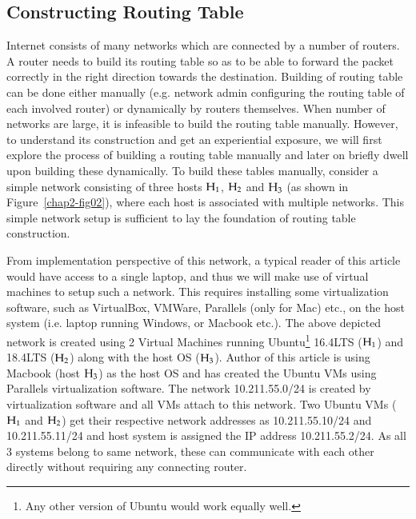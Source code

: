 \begin{multicols}{2}
\section{Constructing Routing Table}\label{chap2-sec4}

Internet consists of many networks which are connected by a number of routers. A router needs to build its routing table so as to be able to forward the packet correctly in the right direction towards the destination. Building of routing table can be done either manually (e.g. network admin configuring the routing table of each involved router) or dynamically by routers themselves. When number of networks are large, it is infeasible to build the routing table manually. However, to understand its construction and get an experiential exposure, we will first explore the process of building a routing table manually and later on briefly dwell upon building these dynamically. To build these tables manually, consider a simple network consisting of three hosts ${\rm H}_{1}$, ${\rm H}_{2}$ and ${\rm H}_{3}$ (as shown in Figure~\ref{chap2-fig02}), where each host is associated with multiple networks. This simple network setup is sufficient to lay the foundation of routing table construction.


From implementation perspective of this network, a typical reader of this article would have access to a single laptop, and thus we will make use of virtual machines to setup such a network. This requires installing some virtualization software, such as VirtualBox\cite{art2-key07}, VMWare\cite{art2-key09}, Parallels\cite{art2-key08} (only for Mac) etc., on the host system (i.e. laptop running Windows, or Macbook etc.). The above depicted network is created using 2 Virtual Machines running Ubuntu\footnote{Any other version of Ubuntu would work equally well.} 16.4LTS (${\rm H}_{1}$) and 18.4LTS (${\rm H}_{2}$) along with the host OS (${\rm H}_{3}$). Author of this article is using Macbook (host ${\rm H}_{3}$) as the host OS and has created the Ubuntu VMs using Parallels\cite{art2-key08} virtualization software. The network 10.211.55.0/24 is created by virtualization software and all VMs attach to this network. Two Ubuntu VMs (${\rm H}_{1}$ and ${\rm H}_{2}$) get their respective network addresses as 10.211.55.10/24 and 10.211.55.11/24 and host system is assigned the IP address 10.211.55.2/24. As all 3 systems belong to same network, these can communicate with each other directly without requiring any connecting router.



\end{multicols}
